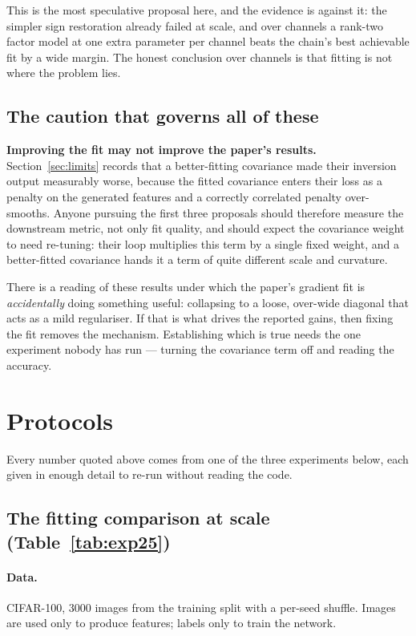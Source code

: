 \documentclass[11pt,a4paper]{article}
\begin{document}
This is the most speculative proposal here, and the evidence is against it: the simpler sign
restoration already failed at scale, and over channels a rank-two factor model at one extra
parameter per channel beats the chain's best achievable fit by a wide margin. The honest
conclusion over channels is that fitting is not where the problem lies.

\subsection{The caution that governs all of these}
\label{sec:caution}

\textbf{Improving the fit may not improve the paper's results.} Section~\ref{sec:limits} records
that a better-fitting covariance made their inversion output measurably worse, because the
fitted covariance enters their loss as a penalty on the generated features and a correctly
correlated penalty over-smooths. Anyone pursuing the first three proposals should therefore
measure the downstream metric, not only fit quality, and should expect the covariance weight to
need re-tuning: their loop multiplies this term by a single fixed weight, and a better-fitted
covariance hands it a term of quite different scale and curvature.

There is a reading of these results under which the paper's gradient fit is \emph{accidentally}
doing something useful: collapsing to a loose, over-wide diagonal that acts as a mild
regulariser. If that is what drives the reported gains, then fixing the fit removes the
mechanism. Establishing which is true needs the one experiment nobody has run --- turning the
covariance term off and reading the accuracy.

\section{Protocols}
\label{sec:protocols}

Every number quoted above comes from one of the three experiments below, each given in enough
detail to re-run without reading the code.

\subsection{The fitting comparison at scale (Table~\ref{tab:exp25})}

\paragraph{Data.} CIFAR-100, 3000 images from the training split with a per-seed shuffle.
Images are used only to produce features; labels only to train the network.
\end{document}
